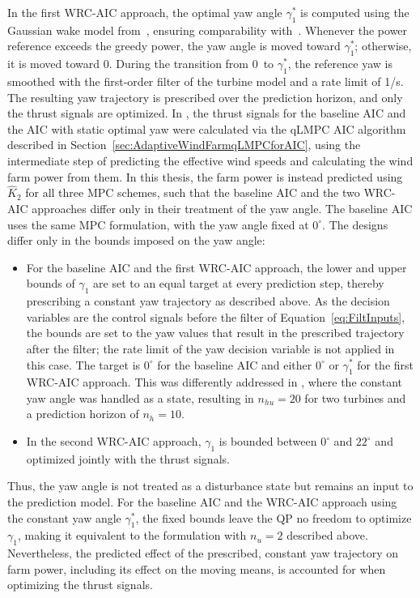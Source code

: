 In the first WRC-AIC approach, the optimal yaw angle $\gamma_1^*$ is computed using the Gaussian wake model from~\cite{bastankhah2016experimental}, ensuring comparability with~\cite{boersma2019constrained}. Whenever the power reference exceeds the greedy power, the yaw angle is moved toward $\gamma_1^*$; otherwise, it is moved toward 0\textdegree. During the transition from 0\textdegree~to $\gamma_1^*$, the reference yaw is smoothed with the first-order filter of the turbine model and a rate limit of 1\textdegree/s. The resulting yaw trajectory is prescribed over the prediction horizon, and only the thrust signals are optimized. In \cite{dittmer2023koopman}, the thrust signals for the baseline AIC and the AIC with static optimal yaw were calculated via the qLMPC AIC algorithm described in Section~\ref{sec:AdaptiveWindFarmqLMPCforAIC}, using the intermediate step of predicting the effective wind speeds and calculating the wind farm power from them. In this thesis, the farm power is instead predicted using $\hat{K}_2$ for all three MPC schemes, such that the baseline AIC and the two WRC-AIC approaches differ only in their treatment of the yaw angle. The baseline AIC uses the same MPC formulation, with the yaw angle fixed at $0^\circ$. The designs differ only in the bounds imposed on the yaw angle:
\begin{itemize}
    \item For the baseline AIC and the first WRC-AIC approach, the lower and upper bounds of $\gamma_1$ are set to an equal target at every prediction step, thereby prescribing a constant yaw trajectory as described above. As the decision variables are the control signals before the filter of Equation~\eqref{eq:FiltInputs}, the bounds are set to the yaw values that result in the prescribed trajectory after the filter; the rate limit of the yaw decision variable is not applied in this case. The target is $0^\circ$ for the baseline AIC and either $0^\circ$ or $\gamma_1^*$ for the first WRC-AIC approach. This was differently addressed in \cite{dittmer2023koopman}, where the constant yaw angle was handled as a state, resulting in $n_{hu} = 20$ for two turbines and a prediction horizon of $n_h = 10$. 
    \item In the second WRC-AIC approach, $\gamma_1$ is bounded between $0^\circ$ and $22^\circ$ and optimized jointly with the thrust signals.
\end{itemize}
Thus, the yaw angle is not treated as a disturbance state but remains an input to the prediction model. For the baseline AIC and the WRC-AIC approach using the constant yaw angle  $\gamma_1^*$, the fixed bounds leave the QP no freedom to optimize $\gamma_1$, making it equivalent to the formulation with $n_u = 2$ described above. Nevertheless, the predicted effect of the prescribed, constant yaw trajectory on farm power, including its effect on the moving means, is accounted for when optimizing the thrust signals.

